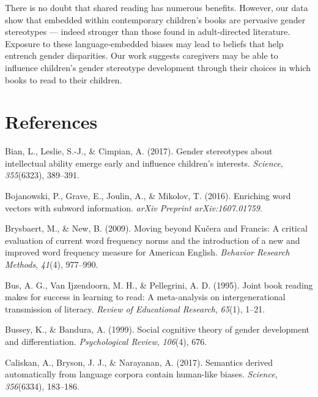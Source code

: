 \documentclass[
  english,
  ,man,floatsintext]{apa6}
\begin{document}
There is no doubt that shared reading has numerous benefits. However, our data show that embedded within contemporary children's books are pervasive gender stereotypes --- indeed stronger than those found in adult-directed literature. Exposure to these language-embedded biases may lead to beliefs that help entrench gender disparities. Our work suggests caregivers may be able to influence children's gender stereotype development through their choices in which books to read to their children.

\newpage

\hypertarget{references}{%
\section{References}\label{references}}

\setlength{\parindent}{-0.5in}
\setlength{\leftskip}{0.5in}

\hypertarget{refs}{}
\leavevmode\hypertarget{ref-bian2017gender}{}%
Bian, L., Leslie, S.-J., \& Cimpian, A. (2017). Gender stereotypes about intellectual ability emerge early and influence children's interests. \emph{Science}, \emph{355}(6323), 389--391.

\leavevmode\hypertarget{ref-bojanowski2016enriching}{}%
Bojanowski, P., Grave, E., Joulin, A., \& Mikolov, T. (2016). Enriching word vectors with subword information. \emph{arXiv Preprint arXiv:1607.01759}.

\leavevmode\hypertarget{ref-brysbaert2009moving}{}%
Brysbaert, M., \& New, B. (2009). Moving beyond Kučera and Francis: A critical evaluation of current word frequency norms and the introduction of a new and improved word frequency measure for American English. \emph{Behavior Research Methods}, \emph{41}(4), 977--990.

\leavevmode\hypertarget{ref-bus1995joint}{}%
Bus, A. G., Van Ijzendoorn, M. H., \& Pellegrini, A. D. (1995). Joint book reading makes for success in learning to read: A meta-analysis on intergenerational transmission of literacy. \emph{Review of Educational Research}, \emph{65}(1), 1--21.

\leavevmode\hypertarget{ref-bussey1999social}{}%
Bussey, K., \& Bandura, A. (1999). Social cognitive theory of gender development and differentiation. \emph{Psychological Review}, \emph{106}(4), 676.

\leavevmode\hypertarget{ref-caliskan2017semantics}{}%
Caliskan, A., Bryson, J. J., \& Narayanan, A. (2017). Semantics derived automatically from language corpora contain human-like biases. \emph{Science}, \emph{356}(6334), 183--186.
\end{document}
